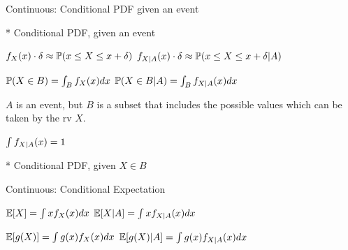 \begin{frame}{Continuous:  Conditional PDF given an event}

{
* Conditional PDF, given an event 

\medskip

\plitemsep 0.15in
\bci 
\item<2-> $f_X(x) \cdot \delta \approx \mathbb{P}( x \le X \le x+\delta )$
$f_{X|A}(x) \cdot \delta \approx \mathbb{P}( x \le X \le x+\delta | A )$

\item<3-> $\mathbb{P}( X \in B ) = \int_B f_X(x) dx$
$\mathbb{P}( X \in B | A ) = \int_B f_{X|A}(x) dx$

\medskip
{} $A$ is an event, but $B$ is a subset that includes the possible values which can be taken by the rv $X.$

\item<4-> $\int f_{X|A}(x) = 1$
\eci
}
{
* Conditional PDF, given $X \in B$

\medskip



}
\end{frame}

\begin{frame}{Continuous:  Conditional Expectation}

{
\plitemsep 0.15in



\vspace{-0.3cm}
\vspace{-0.5cm}
\vspace{-0.5cm}

}
{
\bci 
\item<3-> $\mathbb{E}[ X ] = \int xf_X(x) dx$
$\mathbb{E}[ X | A ] = \int xf_{X|A}(x) dx$

\item<4-> $\mathbb{E}[ g(X) ] = \int g(x)f_X(x) dx$
$\mathbb{E}[ g(X) | A ] = \int g(x)f_{X|A}(x) dx$
\eci

}
\end{frame}

